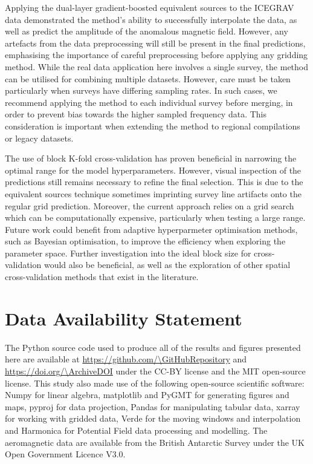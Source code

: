 Applying the dual-layer gradient-boosted equivalent sources to the ICEGRAV data demonstrated the method’s ability to successfully interpolate the data, as well as predict the amplitude of the anomalous magnetic field. However, any artefacts from the data preprocessing will still be present in the final predictions, emphasising the importance of careful preprocessing before applying any gridding method. While the real data application here involves a single survey, the method can be utilised for combining multiple datasets. However, care must be taken particularly when surveys have differing sampling rates. In such cases, we recommend applying the method to each individual survey before merging, in order to prevent bias towards the higher sampled frequency data. This consideration is important when extending the method to regional compilations or legacy datasets.

The use of block K-fold cross-validation has proven beneficial in narrowing the optimal range for the model hyperparameters. However, visual inspection of the predictions still remains necessary to refine the final selection. This is due to the equivalent sources technique sometimes imprinting survey line artifacts onto the regular grid prediction. Moreover, the current approach relies on a grid search which can be computationally expensive, particularly when testing a large range. Future work could benefit from adaptive hyperparmeter optimisation methods, such as Bayesian optimisation, to improve the efficiency when exploring the parameter space. Further investigation into the ideal block size for cross-validation would also be beneficial, as well as the exploration of other spatial cross-validation methods that exist in the literature.



\section{Data Availability Statement}

The Python source code used to produce all of the results and figures presented here are available at \url{https://github.com/\GitHubRepository} and
\url{https://doi.org/\ArchiveDOI} under the CC-BY license and the MIT open-source license. This study also made use of the following open-source scientific software: Numpy \citep{numpy} for linear algebra, matplotlib \citep{matplotlib} and PyGMT \citep{pygmt} for generating figures and maps, pyproj \citep{pyproj} for data projection, Pandas \citep{pandas} for manipulating tabular data, xarray \citep{xarray} for working with gridded data, Verde \citep{verde} for the moving windows and interpolation and Harmonica \citep{harmonica} for Potential Field data processing and modelling. The aeromagnetic data are available from the British Antarctic Survey \citep{ICEGRAV_data} under the UK Open Government Licence V3.0.

